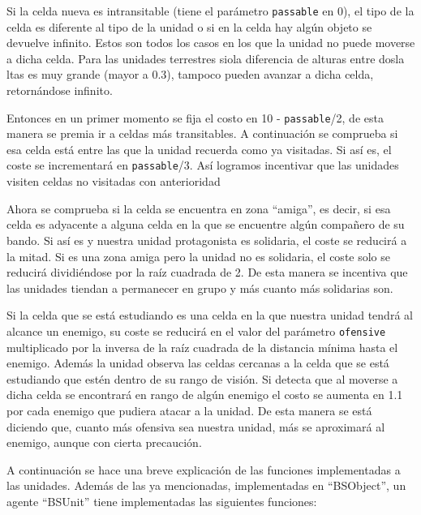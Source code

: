 Si la celda nueva es intransitable (tiene el parámetro \verb|passable| en 0), el tipo de la celda es diferente al tipo de la unidad o si en la celda hay algún objeto se devuelve infinito. Estos son todos los casos en los que la unidad no puede moverse a dicha celda. Para las unidades terrestres siola diferencia de alturas entre dosla ltas es muy grande (mayor a 0.3), tampoco pueden avanzar a dicha celda, retornándose infinito. 
 
Entonces en un primer momento se fija el costo en 10 - \verb|passable|/2, de esta manera se premia ir a celdas más transitables. A continuación se comprueba si esa celda está entre las que la unidad recuerda como ya visitadas. Si así es, el coste se incrementará en \verb|passable|/3. Así logramos incentivar que las unidades visiten celdas no visitadas con anterioridad  
  
Ahora se comprueba si la celda se encuentra en zona ``amiga'', es decir, si esa celda es adyacente a alguna celda en la que se encuentre algún compañero de su bando. Si así es y nuestra unidad protagonista es solidaria, el coste se reducirá a la mitad. Si es una zona amiga pero la unidad no es solidaria, el coste solo se reducirá dividiéndose por la raíz cuadrada de 2. De esta manera se incentiva que las unidades tiendan a permanecer en grupo y más cuanto más solidarias son.

Si la celda que se está estudiando es una celda en la que nuestra unidad tendrá al alcance un enemigo, su coste se reducirá en el valor del parámetro \verb|ofensive|  multiplicado por la inversa de la raíz cuadrada de la distancia mínima hasta el enemigo. Además la unidad observa las celdas cercanas a la celda que se está estudiando que estén dentro de su rango de visión. Si detecta que al moverse a dicha celda se encontrará en rango de algún enemigo el costo se aumenta en 1.1 por cada enemigo que pudiera atacar a la unidad. De esta manera se está diciendo que, cuanto más ofensiva sea nuestra unidad, más se aproximará al enemigo, aunque con cierta precaución.

A continuación se hace una breve explicación de las funciones implementadas a las unidades. Además de las   
ya mencionadas, implementadas en ``BSObject'', un agente ``BSUnit'' tiene implementadas las siguientes funciones:

